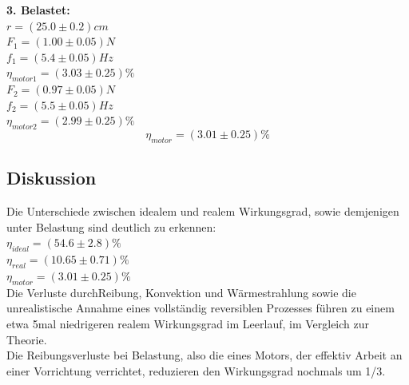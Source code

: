 \documentclass[12pt,a4paper]{article}
\begin{document}
\begin{multicols}{2}
%
%
%
%



\noindent \textbf{3. Belastet:}\\
$r = (25.0 \pm 0.2)cm$\\
$F_1 = (1.00 \pm 0.05)N$\\
$f_1 = (5.4 \pm 0.05)Hz$\\
$\eta_{motor1}=(3.03\pm 0.25)\%$\\
$F_2=(0.97\pm 0.05)N$\\
$f_2 = (5.5 \pm 0.05)Hz$\\
$\eta_{motor2}=(2.99\pm 0.25)\%$\\
$$\eta_{motor}=(3.01\pm 0.25)\%$$


\subsection{Diskussion}

Die Unterschiede zwischen idealem und realem Wirkungsgrad, sowie demjenigen unter Belastung sind deutlich zu erkennen:\\
$\eta_{ideal}=(54.6 \pm 2.8)\%$\\
$\eta_{real}=(10.65 \pm 0.71)\%$\\
$\eta_{motor}=(3.01\pm 0.25)\%$\\

\noindent Die Verluste durchReibung, Konvektion und Wärmestrahlung sowie die unrealistische Annahme eines vollständig reversiblen Prozesses führen zu einem etwa 5mal niedrigeren realem Wirkungsgrad im Leerlauf, im Vergleich zur Theorie.\\
Die Reibungsverluste bei Belastung, also die eines Motors, der effektiv Arbeit an einer Vorrichtung verrichtet, reduzieren den Wirkungsgrad nochmals um 1/3.\\


\end{multicols}
\end{document}
